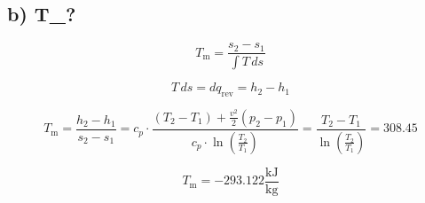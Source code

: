 \subsection*{b) T_{}?}

\[
T_{\text{m}} = \frac{s_2 - s_1}{\int T \, ds}
\]

\[
T \, ds = dq_{\text{rev}} = h_2 - h_1
\]

\[
T_{\text{m}} = \frac{h_2 - h_1}{s_2 - s_1} = c_p \cdot \frac{(T_2 - T_1) + \frac{v^2}{2} (p_2 - p_1)}{c_p \cdot \ln \left( \frac{T_2}{T_1} \right)} = \frac{T_2 - T_1}{\ln \left( \frac{T_2}{T_1} \right)} = 308.45
\]

\[
T_{\text{m}} = -293.122 \frac{\text{kJ}}{\text{kg}}
\]